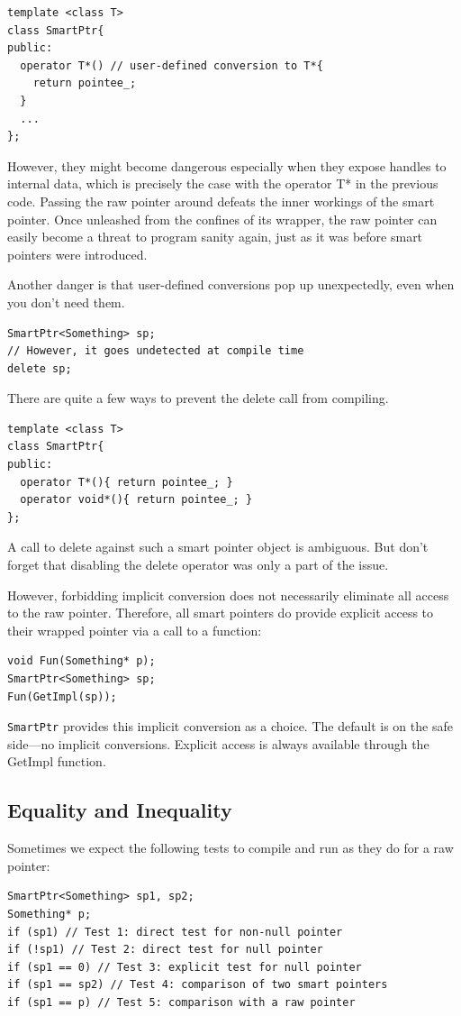 \begin{verbatim}
template <class T>
class SmartPtr{
public:
  operator T*() // user-defined conversion to T*{
    return pointee_;
  }
  ...
};
\end{verbatim}

However, they might become dangerous especially
when they expose handles to internal data, which is precisely the case
with the operator T* in the previous code. Passing the raw pointer
around defeats the inner workings of the smart pointer. Once 
unleashed from the confines of its wrapper, the raw pointer can easily
become a threat to program sanity again, just as it was before smart
pointers were introduced.

Another danger is that user-defined conversions pop up unexpectedly,
even when you don't need them.
\begin{verbatim}
SmartPtr<Something> sp;
// However, it goes undetected at compile time
delete sp;
\end{verbatim}

There are quite a few ways to prevent the delete call from compiling.
\begin{verbatim}
template <class T>
class SmartPtr{
public:
  operator T*(){ return pointee_; }
  operator void*(){ return pointee_; }
};
\end{verbatim}
A call to delete against such a smart pointer object is ambiguous. But
don't forget that disabling the delete operator was only a part of the
issue.

However, forbidding implicit conversion does not necessarily eliminate
all access to the raw pointer. Therefore, all smart pointers do
provide explicit access to their wrapped pointer via a call to a
function: 
\begin{verbatim}
void Fun(Something* p);
SmartPtr<Something> sp;
Fun(GetImpl(sp));
\end{verbatim}

\texttt{SmartPtr} provides this implicit conversion as a choice. The
default is on the safe side—no implicit conversions. Explicit access
is always available through the GetImpl function.

\subsection{Equality and Inequality}

Sometimes we expect the following tests to compile and run
as they do for a raw pointer:
\begin{verbatim}
SmartPtr<Something> sp1, sp2;
Something* p;
if (sp1) // Test 1: direct test for non-null pointer
if (!sp1) // Test 2: direct test for null pointer
if (sp1 == 0) // Test 3: explicit test for null pointer
if (sp1 == sp2) // Test 4: comparison of two smart pointers
if (sp1 == p) // Test 5: comparison with a raw pointer
\end{verbatim}

